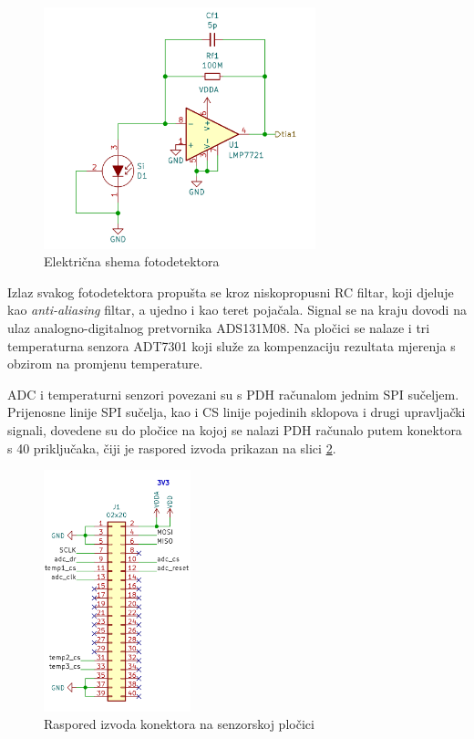 \begin{figure}[htb]
    \centering
    \includegraphics[height=7cm]{slike/fotosenzor.png}
    \caption{Električna shema fotodetektora}
    \label{fig:fotosenzor}
\end{figure}

Izlaz svakog fotodetektora propušta se kroz niskopropusni RC filtar, koji djeluje kao \textit{anti-aliasing} filtar, a ujedno i kao teret pojačala. Signal se na kraju dovodi na ulaz analogno-digitalnog pretvornika ADS131M08. Na pločici se nalaze i tri temperaturna senzora ADT7301 koji služe za kompenzaciju rezultata mjerenja s obzirom na promjenu temperature.

ADC i temperaturni senzori povezani su s PDH računalom jednim SPI sučeljem. Prijenosne linije SPI sučelja, kao i CS linije pojedinih sklopova i drugi upravljački signali, dovedene su do pločice na kojoj se nalazi PDH računalo putem konektora s 40 priključaka, čiji je raspored izvoda prikazan na slici \ref{fig:konektor}.

\begin{figure}[htb]
    \centering
    \includegraphics[height=7cm]{slike/konektor.png}
    \caption{Raspored izvoda konektora na senzorskoj pločici}
    \label{fig:konektor}
\end{figure}

